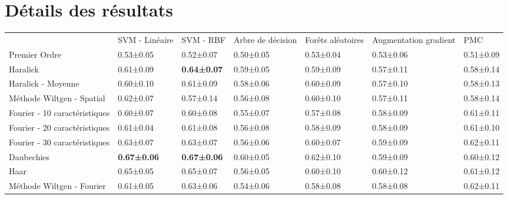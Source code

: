 \chapter{Détails des résultats}
\vspace*{4cm}
\minitoc	
\newpage

\begin{landscape}
\begin{table}[]
\begin{tabular}{lllllll}
                              & SVM - Linéaire     & SVM - RBF          & Arbre de décision & Forêts aléatoires & Augmentation gradient & PMC       \\
Premier Ordre                 & 0.53±0.05          & 0.52±0.07          & 0.50±0.05         & 0.53±0.04         & 0.53±0.06             & 0.51±0.09 \\
\rowcolor[HTML]{E7E6E6} 
Haralick                      & 0.61±0.09          & \textbf{0.64±0.07} & 0.59±0.05         & 0.59±0.09         & 0.57±0.11             & 0.58±0.14 \\
Haralick - Moyenne            & 0.60±0.10          & 0.61±0.09          & 0.58±0.06         & 0.60±0.09         & 0.57±0.10             & 0.58±0.13 \\
Méthode Wiltgen - Spatial     & 0.62±0.07          & 0.57±0.14          & 0.56±0.08         & 0.60±0.10         & 0.57±0.11             & 0.58±0.14 \\
Fourier - 10 caractéristiques & 0.60±0.07          & 0.60±0.08          & 0.55±0.07         & 0.57±0.08         & 0.58±0.09             & 0.61±0.11 \\
Fourier - 20 caractéristiques & 0.61±0.04          & 0.61±0.08          & 0.56±0.08         & 0.58±0.09         & 0.58±0.09             & 0.61±0.10 \\
Fourier - 30 caractéristiques & 0.63±0.07          & 0.63±0.07          & 0.56±0.06         & 0.60±0.07         & 0.59±0.09             & 0.62±0.11 \\
\rowcolor[HTML]{E7E6E6} 
Daubechies                    & \textbf{0.67±0.06} & \textbf{0.67±0.06} & 0.60±0.05         & 0.62±0.10         & 0.59±0.09             & 0.60±0.12 \\
Haar                          & 0.65±0.05          & 0.65±0.07          & 0.56±0.05         & 0.60±0.10         & 0.60±0.12             & 0.61±0.12 \\
Méthode Wiltgen - Fourier     & 0.61±0.05          & 0.63±0.06          & 0.54±0.06         & 0.58±0.08         & 0.58±0.08             & 0.62±0.11 \\

\end{tabular}
\end{table}
\end{landscape}
